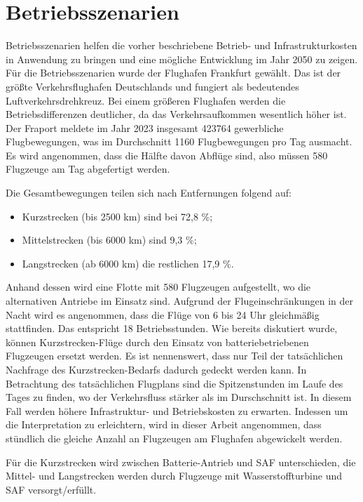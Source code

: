 
\section{Betriebsszenarien}
\label{s:Betriebsszenarien}
Betriebsszenarien helfen die vorher beschriebene Betrieb- und Infrastrukturkosten in Anwendung zu bringen 
und eine mögliche Entwicklung im Jahr 2050 zu zeigen.
Für die Betriebsszenarien wurde der Flughafen Frankfurt gewählt. 
Das ist der größte Verkehrsflughafen Deutschlands und fungiert als bedeutendes Luftverkehrsdrehkreuz. 
Bei einem größeren Flughafen werden die Betriebsdifferenzen deutlicher, da das Verkehrsaufkommen wesentlich höher ist.
Der Fraport meldete im Jahr 2023 insgesamt 423764 gewerbliche Flugbewegungen, was im Durchschnitt 1160 Flugbewegungen pro Tag ausmacht. 
Es wird angenommen, dass die Hälfte davon Abflüge sind, also müssen 580 Flugzeuge am Tag abgefertigt werden.

Die Gesamtbewegungen teilen sich nach Entfernungen folgend auf:
\begin{itemize}
    \item Kurzstrecken (bis 2500 km) sind bei 72,8 \%;
    \item Mittelstrecken (bis 6000 km) sind 9,3 \%;
    \item Langstrecken (ab 6000 km) die restlichen 17,9 \%. 
    \end{itemize}
	
Anhand dessen wird eine Flotte mit 580 Flugzeugen aufgestellt, wo die alternativen Antriebe im Einsatz sind.
Aufgrund der Flugeinschränkungen in der Nacht wird es angenommen, dass die Flüge von 6 bis 24 Uhr gleichmäßig stattfinden. 
Das entspricht 18 Betriebsstunden.
Wie bereits diskutiert wurde, können Kurzstrecken-Flüge durch den Einsatz von batteriebetriebenen Flugzeugen ersetzt werden. 
Es ist nennenswert, dass nur Teil der tatsächlichen Nachfrage des Kurzstrecken-Bedarfs dadurch gedeckt werden kann. 
In Betrachtung des tatsächlichen Flugplans sind die Spitzenstunden im Laufe des Tages zu finden, wo
der Verkehrsfluss stärker als im Durschschnitt ist. In diesem Fall werden höhere Infrastruktur- und Betriebskosten zu erwarten.
Indessen um die Interpretation zu erleichtern, wird in dieser Arbeit angenommen, dass stündlich die gleiche Anzahl an Flugzeugen 
am Flughafen abgewickelt werden. 

Für die Kurzstrecken wird zwischen Batterie-Antrieb und SAF unterschieden, 
die Mittel- und Langstrecken werden durch Flugzeuge mit Wasserstoffturbine und SAF versorgt/erfüllt.

